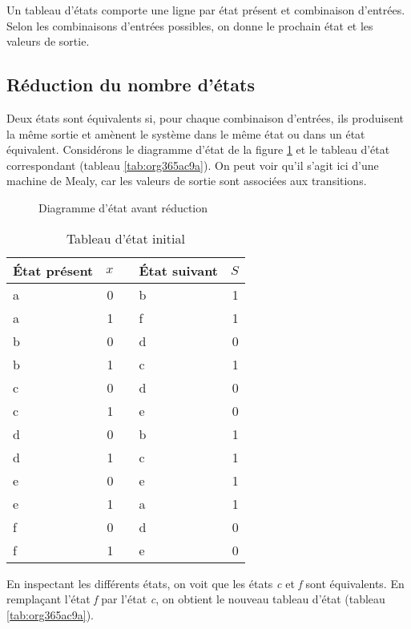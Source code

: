 \documentclass[11pt]{article}
\begin{document}
Un tableau d'états comporte une ligne par état présent et combinaison
d'entrées. Selon les combinaisons d'entrées possibles, on donne le
prochain état et les valeurs de sortie.

\subsection{Réduction du nombre d'états}
\label{sec:org1090fdf}

Deux états sont équivalents si, pour chaque combinaison d'entrées, ils
produisent la même sortie et amènent le système dans le même état ou
dans un état équivalent. Considérons le diagramme d'état de la figure
\ref{fig:orgb01c320} et le tableau d'état correspondant (tableau 
\ref{tab:org365ac9a}). On peut voir qu'il s'agit ici d'une machine de
Mealy, car les valeurs de sortie sont associées aux transitions.


\begin{figure}[htbp]
\centering

\caption{\label{fig:orgb01c320}Diagramme d'état avant réduction}
\end{figure}


\begin{table}[htbp]
\caption{\label{tab:orgc99f4f7}Tableau d'état initial}
\centering
\begin{tabular}{lrllr}
État présent & \(x\) &  & État suivant & \(S\)\\
\hline
a & 0 &  & b & 1\\
a & 1 &  & f & 1\\
b & 0 &  & d & 0\\
b & 1 &  & c & 1\\
c & 0 &  & d & 0\\
c & 1 &  & e & 0\\
d & 0 &  & b & 1\\
d & 1 &  & c & 1\\
e & 0 &  & e & 1\\
e & 1 &  & a & 1\\
f & 0 &  & d & 0\\
f & 1 &  & e & 0\\
\end{tabular}
\end{table}

En inspectant les différents états, on voit que les états \emph{c} et \emph{f}
sont équivalents. En remplaçant l'état \emph{f} par l'état \emph{c}, on obtient
le nouveau tableau d'état (tableau \ref{tab:org365ac9a}).
\end{document}
